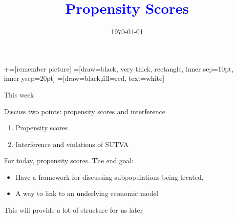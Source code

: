 \documentclass[notes,11pt, aspectratio=169]{beamer}
\title[]{\textcolor{blue}{Propensity Scores}}
\author[PGP]{}
\institute[FRBNY]{\small{Paul Goldsmith-Pinkham}}
\date{\today}
\newenvironment{wideitemize}{\itemize\addtolength{\itemsep}{10pt}}{\enditemize}
\begin{document}
\newcommand\marktopleft[1]{%
    \tikz[overlay,remember picture] 
        \node (marker-#1-a) at (-.3em,.3em) {};%
}
\newcommand\markbottomright[2]{%
    \tikz[overlay,remember picture] 
        \node (marker-#1-b) at (0em,0em) {};%
}
+=[remember picture] 
 =[draw=black, very thick, rectangle, inner sep=10pt, inner ysep=20pt]
 =[draw=black,fill=red, text=white]

\begin{frame}
\maketitle

\end{frame}

\begin{frame}{This week}
 
  \begin{wideitemize}
  \item  Discuss two points: propensity scores and interference
    \begin{enumerate}
    \item Propensity scores
    \item Interference and violations of SUTVA
    \end{enumerate}
  \item For today, propensity scores. The end goal: 
    \begin{itemize}
    \item Have a framework for discussing subpopulations
      being treated,
    \item A way to link to an underlying economic model
    \end{itemize}
  \item This will provide a lot of structure for us later
  \end{wideitemize}
\end{frame}
\end{document}
